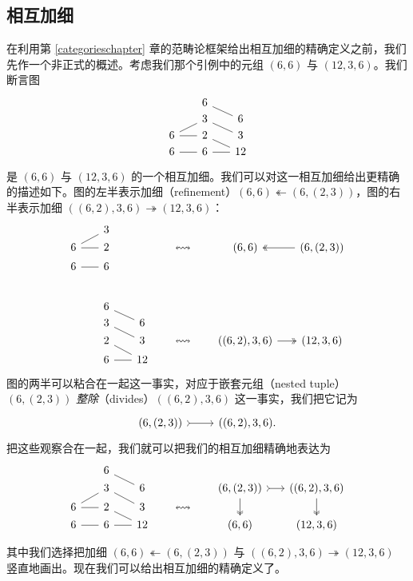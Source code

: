 \subsection{相互加细}
\label{subsectionmutualrefinements}

在利用第 \ref{categorieschapter} 章的范畴论框架给出相互加细的精确定义之前，我们先作一个非正式的概述。考虑我们那个引例中的元组 $(6,6)$ 与 $(12,3,6)$。我们断言图
        \[ \begin{tikzcd} [row sep = 1, column sep = 8]
           & & 6 \ar[-,drr] & &  \\
          & & 3 \ar[-,drr] & & 6 \\
         6  \ar[-,urr] \ar[-,rr]  & & 2 \ar[-,drr] & & 3 \\
        6 \ar[rr,-] & & 6 \ar[-,swap,rr] & & 12 \\
           &  & &  &  \\
        \end{tikzcd} \]
是 $(6,6)$ 与 $(12,3,6)$ 的一个相互加细。我们可以对这一相互加细给出更精确的描述如下。图的左半表示加细（refinement）$(6,6) \twoheadleftarrow (6,(2,3))$，图的右半表示加细 $((6,2),3,6) \twoheadrightarrow (12,3,6)$：
\[ \begin{tikzcd} [row sep = 1, column sep = 8]
 & & 3 & & & & & & & & \\
6 \ar[rr,-] \ar[urr,-] & & 2 & & & & \leftrightsquigarrow & & (6,6) & & \ar[ll, two heads] (6,(2,3)) \\
6 \ar[rr,-] & & 6 & & & & & & & & \\
         & &  & & & & & &  & & \\[2em]
 & & 6 \ar[drr,-] & & & & & & & & \\
 & & 3 \ar[drr,-]& & 6 & & & & & & \\
 & & 2 \ar[drr,-] & & 3 & & \leftrightsquigarrow & & ((6,2),3,6) \ar[rr,two heads] & & (12,3,6) \\
 & & 6 \ar[rr,-] & & 12 & & & & & & \\
\end{tikzcd} \]
图的两半可以粘合在一起这一事实，对应于嵌套元组（nested tuple）$(6,(2,3))$ {\it 整除}（divides）$((6,2),3,6)$ 这一事实，我们把它记为
\[
\begin{tikzcd}
(6,(2,3)) \ar[r,rightarrowtail] & ((6,2),3,6).
\end{tikzcd}
\]
把这些观察合在一起，我们就可以把我们的相互加细精确地表达为
        \[ \begin{tikzcd} [row sep = 1, column sep = 8]
           & & 6 \ar[-,drr] & & & & & &  & & \\
          & & 3 \ar[-,drr] & & 6 & & & & (6,(2,3)) \ar[dd, two heads] \ar[rr,rightarrowtail] & & ((6,2),3,6) \ar[dd, two heads] \\
         6  \ar[-,urr] \ar[-,rr]  & & 2 \ar[-,drr] & & 3 & & \leftrightsquigarrow & & & & \\
        6 \ar[rr,-] & & 6 \ar[-,swap,rr] & & 12 & & & & (6,6) & & (12,3,6) \\
           &  & &  &  & & & & \\
        \end{tikzcd} \]
其中我们选择把加细 $(6,6) \twoheadleftarrow (6,(2,3))$ 与 $((6,2),3,6) \twoheadrightarrow (12,3,6)$ 竖直地画出。现在我们可以给出相互加细的精确定义了。


